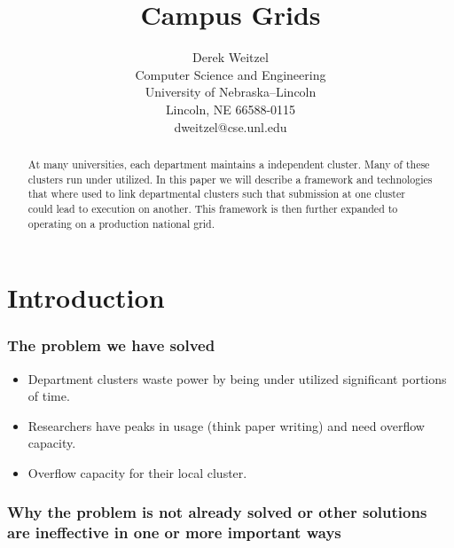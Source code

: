 \documentclass[11pt]{article}
\title{\bf Campus Grids}
\author{Derek Weitzel\\
Computer Science and Engineering\\
University of Nebraska--Lincoln\\
Lincoln, NE 66588-0115\\
dweitzel@cse.unl.edu
       }
\newcommand{\doublespace}{\baselineskip0.34truein}
\begin{document}
\maketitle

\begin{abstract}

At many universities, each department maintains a independent cluster.  Many of these clusters run under utilized.  In this paper we will describe a framework and technologies that where used to link departmental clusters such that submission at one cluster could lead to execution on another.  This framework is then further expanded to operating on a production national grid.

\end{abstract}



\section{Introduction}
\label{sec:Introduction}

\subsubsection* {The problem we have solved}

\begin{itemize}

\item Department clusters waste power by being under utilized significant portions of time.
\item Researchers have peaks in usage (think paper writing) and need overflow capacity.
\item Overflow capacity for their local cluster.


\end{itemize}


\subsubsection* {Why the problem is not already solved or other solutions 
are ineffective in one or more important ways}
\end{document}
